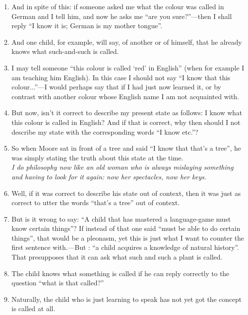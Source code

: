 \documentclass{book}
\begin{document}
\begin{enumerate}
\item
And in spite of this: if someone asked me what the colour was called in German
and I tell him, and now he asks me ``are you sure?''---then I shall reply ``I
know it is; German is my mother tongue''.

\item
And one child, for example, will say, of another or of himself, that he already
knows what such-and-such is called.

\item
I may tell someone ``this colour is called `red' in English'' (when for example
I am teaching him English). In this case I should not say ``I know that this
colour...''---I would perhaps say that if I had just now learned it, or by
contrast with another colour whose English name I am not acquainted with.

\item
But now, isn't it correct to describe my present state as follows: I know what
this colour is called in English? And if that is correct, why then should I not
describe my state with the corresponding words ``I know etc.''?

\item
So when Moore sat in front of a tree and said ``I know that that's a tree'', he
was simply stating the truth about this state at the time.
\\
\emph{I do philosophy now like an old woman who is always mislaying something
and having to look for it again: now her spectacles, now her keys.}

\item
Well, if it was correct to describe his state out of context, then it was just
as correct to utter the words ``that's a tree'' out of context.

\item
But is it wrong to say: ``A child that has mastered a language-game must know
certain things''?  If instead of that one said ``must be able to do certain
things'', that would be a pleonasm, yet this is just what I want to counter the
first sentence with.---But : ``a child acquires a knowledge of natural
history''. That presupposes that it can ask what such and such a plant is
called.

\item
The child knows what something is called if he can reply correctly to the
question ``what is that called?''

\item
Naturally, the child who is just learning to speak has not yet got the concept
is called at all.


\end{enumerate}
\end{document}
